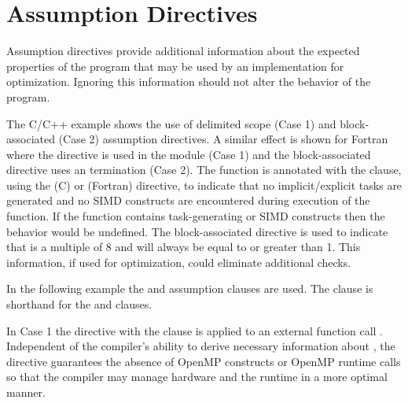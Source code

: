 \section{Assumption Directives}
\label{sec:assumption}



Assumption directives provide additional information about the expected properties of 
the program that may be used by an implementation for optimization. 
Ignoring this information should not alter the behavior of the program. 

The C/C++ example 
shows the use of delimited scope (Case 1) and block-associated (Case 2) assumption directives.
A similar effect is shown for Fortran where the  directive is used in the module (Case 1)
and the block-associated directive uses an  termination (Case 2). 
The function  is annotated with the  clause, using the  
(C) or  (Fortran) directive, to indicate that no implicit/explicit tasks are generated and no 
SIMD constructs are encountered during execution of the function. If the function  contains 
task-generating or SIMD constructs then the behavior would be undefined. The block-associated 
 directive is used to indicate that  is a multiple of 8 and 
will always be equal to or greater than 1. This information, if used for optimization,
could eliminate additional checks.


\pagebreak
In the following example the  and  assumption clauses are used.
The  clause is shorthand for the  and  clauses.

In Case 1 the  directive with the  clause is applied to an external function call .
Independent of the compiler's ability to derive necessary information about , the  directive guarantees 
the absence of OpenMP constructs or OpenMP runtime calls so that the compiler may manage hardware and the runtime in a more optimal manner.

